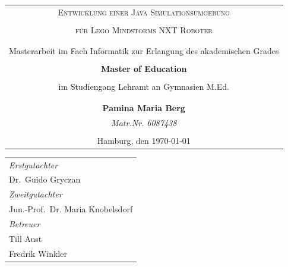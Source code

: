 \begin{titlepage}
\begin{center} 
\vspace{0.5cm} 
\begin{tabular}{c}
\Large \textsc{Entwicklung einer Java Simulationsumgebung}\\
 \\
\Large \textsc{für Lego Mindstorms NXT Roboter}\\
\\
\\
\small Masterarbeit im Fach Informatik zur Erlangung des akademischen Grades\\
\\
\normalsize \textbf{Master of Education}\\
\\
\small im Studiengang Lehramt an Gymnasien M.Ed.\\
\\
\\
\large \textbf{Pamina Maria Berg}\\
\small \emph{Matr.Nr. 6087438}\\
\\
\normalsize Hamburg, den \today
\end{tabular}
\par 
\end{center}
\par
\vspace*{3cm}
\begin{tabular}{l}
\emph{Erstgutachter}\\
Dr.\, Guido Gryczan\\
\emph{Zweitgutachter}\\
Jun.-Prof.\, Dr. Maria Knobelsdorf\\
\emph{Betreuer}\\
Till Aust\\
Fredrik Winkler\\
\end{tabular}

\end{titlepage}
